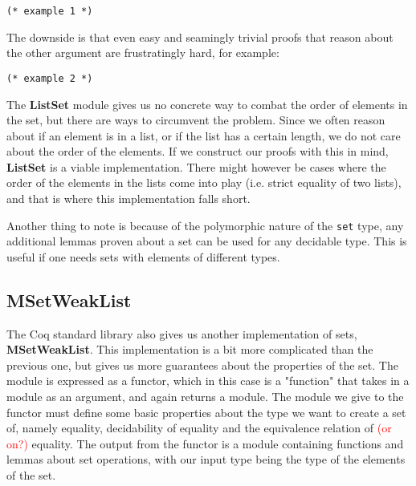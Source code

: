\begin{minipage}{\linewidth}
\begin{lstlisting}[language=Coq, label={lst:set_op_ex1}, caption={Easy proof of lemma in \lstinline{ListSet}}]
(* example 1 *)
\end{lstlisting}
\end{minipage}

The downside is that even easy and seamingly trivial proofs that reason about the other argument are frustratingly hard,
for example:

\begin{minipage}{\linewidth}
\begin{lstlisting}[language=Coq, label={lst:set_op_ex2}, caption={Hard proof of lemma in \lstinline{ListSet}}]
(* example 2 *)
\end{lstlisting}
\end{minipage}

The \textbf{ListSet} module gives us no concrete way to combat the order of elements in the set,
but there are ways to circumvent the problem.
Since we often reason about if an element is in a list, or if the list has a certain length,
we do not care about the order of the elements.
If we construct our proofs with this in mind, \textbf{ListSet} is a viable implementation.
There might however be cases where the order of the elements in the lists come into play (i.e. strict equality of two lists),
and that is where this implementation falls short.

Another thing to note is because of the polymorphic nature of the \lstinline{set} type, any additional lemmas proven about a set can be
used for any decidable type. This is useful if one needs sets with elements of different types.

\subsection{MSetWeakList}

The Coq standard library also gives us another implementation of sets, \textbf{MSetWeakList}.
This implementation is a bit more complicated than the previous one,
but gives us more guarantees about the properties of the set.
The module is expressed as a functor, which in this case is a "function" that takes in a module as an argument, and again returns a module.
The module we give to the functor must define some basic properties about the type we want to create a set of,
namely equality, decidability of equality and the equivalence relation of \textcolor{red}{(or on?)} equality.
The output from the functor is a module containing functions and lemmas about set operations,
with our input type being the type of the elements of the set.

